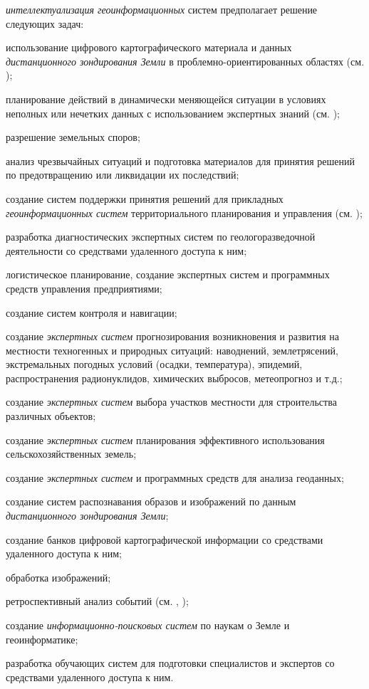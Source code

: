 \textit{интеллектуализация геоинформационных} систем предполагает решение следующих задач:
\begin{textitemize}
	\item использование цифрового картографического материала и данных \textit{дистанционного зондирования Земли} в проблемно-ориентированных областях (см. );
	\item планирование действий в динамически меняющейся ситуации в условиях неполных или нечетких данных с использованием экспертных знаний (см. ); 
	\item разрешение земельных споров;
	\item анализ чрезвычайных ситуаций и подготовка материалов для принятия решений по предотвращению или ликвидации их последствий; 
	\item создание систем поддержки принятия решений для прикладных \textit{геоинформационных систем} территориального планирования и управления (см. ); 
	\item разработка диагностических экспертных систем по геологоразведочной деятельности со средствами удаленного доступа к ним;
	\item логистическое планирование, создание экспертных систем и программных средств управления предприятиями;
	\item создание систем контроля и навигации;
	\item создание \textit{экспертных систем} прогнозирования возникновения и развития на местности техногенных и природных ситуаций: наводнений, землетрясений, экстремальных погодных условий (осадки, температура), эпидемий, распространения радионуклидов, химических выбросов, метеопрогноз и т.д.;
	\item создание \textit{экспертных систем} выбора участков местности для строительства различных объектов;
	\item создание \textit{экспертных систем} планирования эффективного использования сельскохозяйственных земель;
	\item создание \textit{экспертных систем} и программных средств для анализа геоданных;
	\item создание систем распознавания образов и изображений по данным \textit{дистанционного зондирования Земли};
	\item создание банков цифровой картографической информации со средствами удаленного доступа к ним;
	\item обработка изображений;
	\item ретроспективный анализ событий (см. , );
	\item создание \textit{информационно-поисковых систем} по наукам о Земле и геоинформатике;
	\item разработка обучающих систем для подготовки специалистов и экспертов со средствами удаленного доступа к ним.
\end{textitemize}

